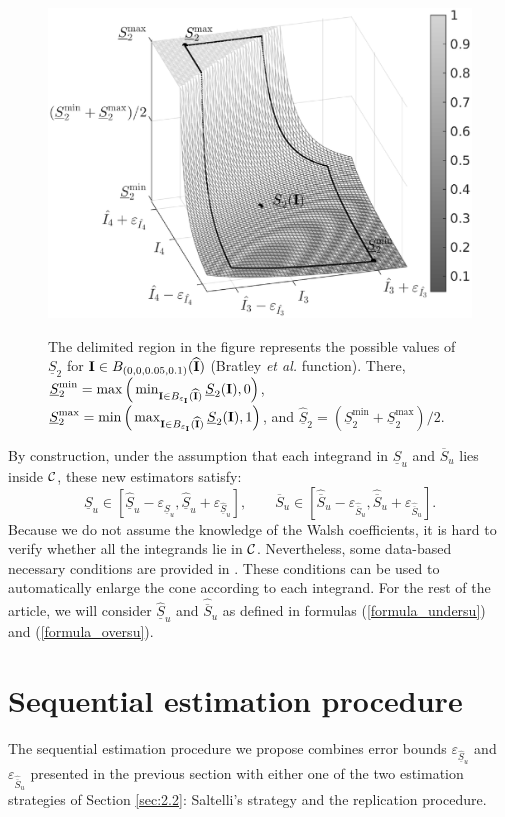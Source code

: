 \begin{figure}[t]
\caption{The delimited region in the figure represents the possible values of $\underline{S}_2$ for $\boldsymbol{\mathbf{I}}\in B_{(0,0,0.05,0.1)}(\widehat{\boldsymbol{\mathbf{I}}})$ (Bratley \textit{et al.} function). There, $\underline{S}_2^{\min}=\max\Big{(}\min_{\boldsymbol{\mathbf{I}}\in B_{\varepsilon_{\boldsymbol{\mathbf{I}}}}(\widehat{\boldsymbol{\mathbf{I}}})} \underline{S}_2(\boldsymbol{\mathbf{I}}),0\Big{)}$, $\underline{S}_2^{\max}=\min\Big{(}\max_{\boldsymbol{\mathbf{I}}\in B_{\varepsilon_{\boldsymbol{\mathbf{I}}}}(\widehat{\boldsymbol{\mathbf{I}}})} \underline{S}_2(\boldsymbol{\mathbf{I}}),1\Big{)}$, and $\widehat{\underline{S}}_2=(\underline{S}_2^{\min}+\underline{S}_2^{\max})/2$.}
\centering
\includegraphics[width=.45\textwidth]{Fig1.eps}
\label{fig:1}       %
\end{figure}

By construction, under the assumption that each integrand in $\underline{S}_u$ and $\overline{S}_u$ lies inside $\mathcal{C}$, these new estimators satisfy: \[ \underline{S}_u\in \left[ \widehat{\underline{S}}_u - \varepsilon_{\widehat{\underline{S}}_u}, \widehat{\underline{S}}_u + \varepsilon_{\widehat{\underline{S}}_u} \right], \qquad \overline{S}_u\in \left[ \widehat{\overline{S}}_u - \varepsilon_{\widehat{\overline{S}}_u}, \widehat{\overline{S}}_u + \varepsilon_{\widehat{\overline{S}}_u} \right] .\]
Because we do not assume the knowledge of the Walsh coefficients, it is hard to verify whether all the integrands lie in $\mathcal{C}$. Nevertheless, some data-based necessary conditions are provided in \cite{HicJimLi}. These conditions can be used to automatically enlarge the cone according to each integrand. For the rest of the article, we will consider $\widehat{\underline{S}}_u$ and $\widehat{\overline{S}}_u$ as defined in formulas (\ref{formula_undersu}) and (\ref{formula_oversu}).

\section{Sequential estimation procedure}
\label{sec:4}
The sequential estimation procedure we propose combines error bounds $\varepsilon_{\widehat{\underline{S}}_u}$ and $\varepsilon_{\widehat{\overline{S}}_u}$ presented in the previous section with either one of the two estimation strategies of Section \ref{sec:2.2}: Saltelli's strategy and the replication procedure. 

